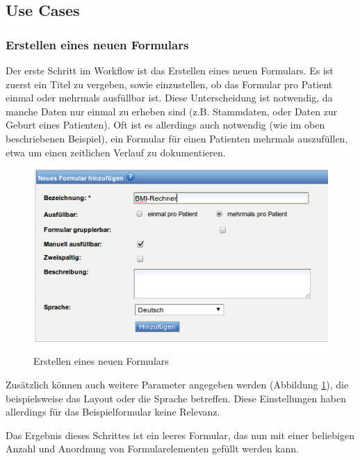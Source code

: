 \subsection{Use Cases}

\subsubsection{Erstellen eines neuen Formulars}

Der erste Schritt im Workflow ist das Erstellen eines neuen Formulars. Es ist zuerst ein Titel zu vergeben, sowie einzustellen, ob das Formular pro Patient einmal oder mehrmals ausfüllbar ist. Diese Unterscheidung ist notwendig, da manche Daten nur einmal zu erheben sind (z.B. Stammdaten, oder Daten zur Geburt eines Patienten). Oft ist es allerdings auch notwendig (wie im oben beschriebenen Beispiel), ein Formular für einen Patienten mehrmals auszufüllen, etwa um einen zeitlichen Verlauf zu dokumentieren.
 
\begin{figure}[h]
\begin{center}
\includegraphics[scale=0.5]{figures/workflow_neues_formular}
\caption{Erstellen eines neuen Formulars}

\label{abb_workflow_neues_formular}
\end{center}
\end{figure}

Zusätzlich können auch weitere Parameter angegeben werden (Abbildung \ref{abb_workflow_neues_formular}), die beispielsweise das Layout oder die Sprache betreffen. Diese Einstellungen haben allerdings für das Beispielformular keine Relevanz.

Das Ergebnis dieses Schrittes ist ein leeres Formular, das nun mit einer beliebigen Anzahl und Anordnung von Formularelementen gefüllt werden kann.

